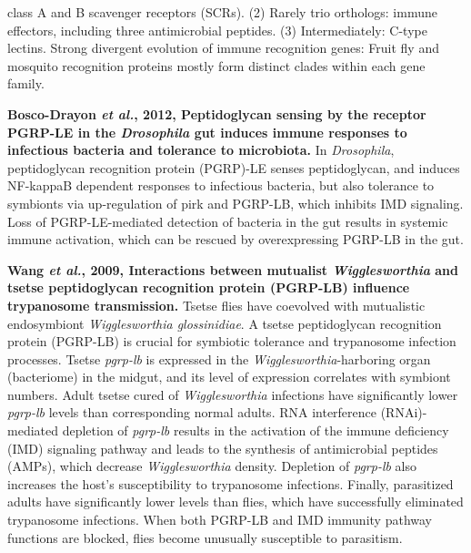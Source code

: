 \documentclass[11pt]{article}
\begin{document}
\begin{sloppypar}
class A and B scavenger receptors (SCRs). \newline
(2) Rarely trio orthologs: 
immune effectors, including three antimicrobial peptides.\newline
(3) Intermediately: 
C-type lectins.\newline
Strong divergent evolution of immune recognition genes: \newline
Fruit fly and mosquito recognition proteins mostly form distinct clades within each gene family.
\par
\textbf{Bosco-Drayon \textit{et al.}, 2012, Peptidoglycan sensing by the receptor PGRP-LE in the \textit{Drosophila} gut induces immune responses to infectious bacteria and tolerance to microbiota.} \newline
In \textit{Drosophila}, peptidoglycan recognition protein (PGRP)-LE senses peptidoglycan, and induces NF-kappaB dependent responses to infectious bacteria, but also tolerance to symbionts via up-regulation of pirk and PGRP-LB, which inhibits IMD signaling. 
Loss of PGRP-LE-mediated detection of bacteria in the gut results in systemic immune activation, which can be rescued by overexpressing PGRP-LB in the gut.
\par
\textbf{Wang \textit{et al.}, 2009, Interactions between mutualist \textit{Wigglesworthia} and tsetse peptidoglycan recognition protein (PGRP-LB) influence trypanosome transmission.} \newline
Tsetse flies have coevolved with mutualistic endosymbiont \textit{Wigglesworthia glossinidiae}. 
A tsetse peptidoglycan recognition protein (PGRP-LB) is crucial for symbiotic tolerance and trypanosome infection processes. 
Tsetse \textit{pgrp-lb} is expressed in the \textit{Wigglesworthia}-harboring organ (bacteriome) in the midgut, and its level of expression correlates with symbiont numbers. 
Adult tsetse cured of \textit{Wigglesworthia} infections have significantly lower \textit{pgrp-lb} levels than corresponding normal adults. 
RNA interference (RNAi)-mediated depletion of \textit{pgrp-lb} results in the activation of the immune deficiency (IMD) signaling pathway and leads to the synthesis of antimicrobial peptides (AMPs), which decrease \textit{Wigglesworthia} density. 
Depletion of \textit{pgrp-lb} also increases the host's susceptibility to trypanosome infections. 
Finally, parasitized adults have significantly lower  levels than flies, which have successfully eliminated trypanosome infections. 
When both PGRP-LB and IMD immunity pathway functions are blocked, flies become unusually susceptible to parasitism. 

\end{sloppypar}
\end{document}
